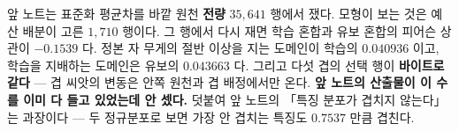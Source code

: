 
앞 노트는 표준화 평균차를 바깥 원천 \textbf{전량} $35,641$ 행에서 쟀다. 모형이 보는 것은 예산 배분이 고른 $1,710$ 행이다. 그 행에서 다시 재면 학습 혼합과 유보 혼합의 피어슨 상관이 $-0.1539$ 다. 정본 자 무게의 절반 이상을 지는 도메인이 학습의 $0.040936$ 이고, 학습을 지배하는 도메인은 유보의 $0.043663$ 다. 그리고 다섯 겹의 선택 행이 \textbf{바이트로 같다} --- 겹 씨앗의 변동은 안쪽 원천과 겹 배정에서만 온다. \textbf{앞 노트의 산출물이 이 수를 이미 다 들고 있었는데 안 셌다.} 덧붙여 앞 노트의 「특징 분포가 겹치지 않는다」는 과장이다 --- 두 정규분포로 보면 가장 안 겹치는 특징도 $0.7537$ 만큼 겹친다.
